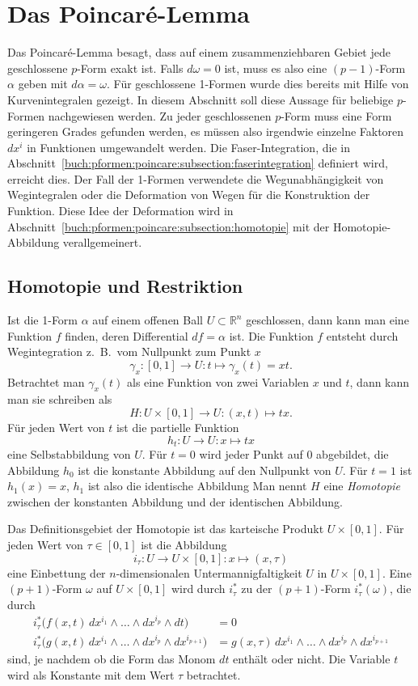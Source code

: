 %
%
\section{Das Poincaré-Lemma
\label{buch:pformen:section:poincarelemma}}
Das Poincaré-Lemma besagt, dass auf einem zusammenziehbaren Gebiet jede
geschlossene $p$-Form exakt ist.
Falls $d\omega=0$ ist, muss es also eine $(p-1)$-Form $\alpha$ geben mit
$d\alpha=\omega$.
Für geschlossene 1-Formen wurde dies bereits mit Hilfe von Kurvenintegralen
gezeigt.
In diesem Abschnitt soll diese Aussage für beliebige $p$-Formen
nachgewiesen werden.
Zu jeder geschlossenen $p$-Form muss eine Form geringeren Grades gefunden
werden, es müssen also irgendwie einzelne Faktoren $dx^i$ in Funktionen
umgewandelt werden.
Die Faser-Integration, die in
Abschnitt~\ref{buch:pformen:poincare:subsection:faserintegration}
definiert wird, erreicht dies.
Der Fall der 1-Formen verwendete die Wegunabhängigkeit von Wegintegralen
oder die Deformation von Wegen für die Konstruktion der Funktion.
Diese Idee der Deformation wird
in Abschnitt~\ref{buch:pformen:poincare:subsection:homotopie}
mit der Homotopie-Abbildung verallgemeinert.

%
%
\subsection{Homotopie und Restriktion}
%
Ist die 1-Form $\alpha$ auf einem offenen Ball $U\subset \mathbb{R}^n$
geschlossen, dann kann man eine Funktion $f$ finden, deren Differential
$df=\alpha$ ist.
Die Funktion $f$ entsteht durch Wegintegration z.~B.~vom Nullpunkt zum
Punkt $x$
\[
\gamma_x
\colon [0,1] \to U
:
t\mapsto \gamma_x(t) = xt.
\]
Betrachtet man $\gamma_x(t)$ als eine Funktion von zwei Variablen
$x$ und $t$, dann kann man sie schreiben als
\[
H
\colon
U\times[0,1]
\to
U
:
(x,t) \mapsto tx.
\]
Für jeden Wert von $t$ ist die partielle Funktion
\[
h_t \colon U \to U : x \mapsto tx
\]
eine Selbstabbildung von $U$.
Für $t=0$ wird jeder Punkt auf $0$ abgebildet, die Abbildung $h_0$ ist
die konstante Abbildung auf den Nullpunkt von $U$.
Für $t=1$ ist $h_1(x)=x$, $h_1$ ist also die identische Abbildung 
Man nennt $H$ eine {\em Homotopie} zwischen der konstanten Abbildung
und der identischen Abbildung.

Das Definitionsgebiet der Homotopie ist das karteische Produkt
$U\times[0,1]$.
Für jeden Wert von $\tau\in[0,1]$ ist die Abbildung
\[
i_\tau
\colon U \to U\times[0,1]
:
x\mapsto (x,\tau)
\]
eine Einbettung der $n$-dimensionalen Untermannigfaltigkeit $U$ in
$U\times[0,1]$.
Eine $(p+1)$-Form $\omega$ auf $U\times[0,1]$ wird durch $i_\tau^*$ zu
der $(p+1)$-Form $i_\tau^*(\omega)$, die durch
\begin{align*}
i_\tau^*\bigl(
f(x,t)
\,dx^{i_1}\wedge \dots \wedge dx^{i_p}\wedge dt
\bigr)
&=
0
\\
i_\tau^*\bigl(
g(x,t)
\,dx^{i_1}\wedge \dots \wedge dx^{i_p}\wedge dx^{i_{p+1}}
\bigr)
&=
g(x,\tau)
\,dx^{i_1}\wedge \dots \wedge dx^{i_p}\wedge dx^{i_{p+1}}
\end{align*}
sind, je nachdem ob die Form das Monom $dt$ enthält oder nicht.
Die Variable $t$ wird als Konstante mit dem Wert $\tau$ betrachtet.

